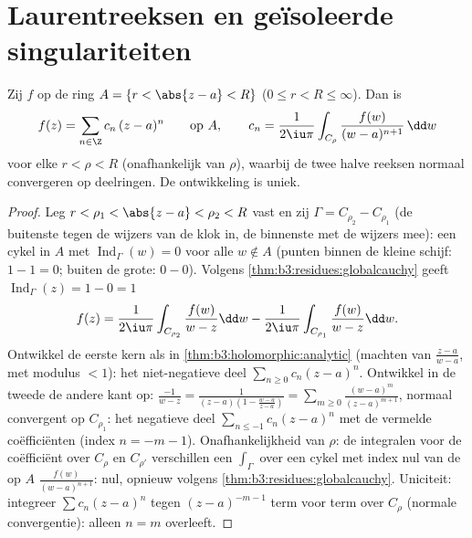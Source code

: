 \section{Laurentreeksen en geïsoleerde singulariteiten}

\begin{theorem}[Laurentontwikkeling]\label{thm:b3:residues:laurent}
Zij $f$  op de ring $A = \{r < \abs{z - a} < R\}$ ($0
\leq r < R \leq \infty$). Dan is
\[
f(z) = \sum_{n\in\Z}c_n\,(z - a)^n
\qquad\text{op } A,
\qquad
c_n = \frac1{2\iu\pi}\int_{C_\rho}\frac{f(w)}{(w -
a)^{n+1}}\,\dd w
\]
voor elke $r < \rho < R$ (onafhankelijk van $\rho$), waarbij de
twee halve reeksen normaal convergeren op  deelringen. De
ontwikkeling is uniek.
\end{theorem}

\begin{proof}
Leg $r < \rho_1 < \abs{z - a} < \rho_2 < R$ vast en zij $\Gamma =
C_{\rho_2} - C_{\rho_1}$ (de buitenste tegen de wijzers van de
klok in, de binnenste met de wijzers mee): een cykel in $A$ met
$\operatorname{Ind}_\Gamma(w) = 0$ voor alle $w \notin A$ (punten
binnen de kleine schijf: $1 - 1 = 0$; buiten de grote: $0 - 0$).
Volgens \cref{thm:b3:residues:globalcauchy} geeft
$\operatorname{Ind}_\Gamma(z) = 1 - 0 = 1$
\[
f(z) = \frac1{2\iu\pi}\int_{C_{\rho_2}}\frac{f(w)}{w - z}\dd
w - \frac1{2\iu\pi}\int_{C_{\rho_1}}\frac{f(w)}{w - z}\dd w .
\]
Ontwikkel de eerste kern als in
\cref{thm:b3:holomorphic:analytic} (machten van $\frac{z - a}{w -
a}$, met modulus $< 1$): het niet-negatieve deel
$\sum_{n\geq0}c_n(z-a)^n$. Ontwikkel in de tweede de andere kant
op: $\frac{-1}{w - z} = \frac1{(z-a)(1 - \frac{w - a}{z - a})} =
\sum_{m\geq0}\frac{(w-a)^m}{(z - a)^{m+1}}$, normaal convergent
op $C_{\rho_1}$: het negatieve deel $\sum_{n\leq-1}c_n(z-a)^n$
met de vermelde coëfficiënten (index $n = -m-1$). Onafhankelijkheid
van $\rho$: de integralen voor de coëfficiënt over $C_{\rho}$ en
$C_{\rho'}$ verschillen een $\int_\Gamma$ over een cykel met
index nul van de op $A$  $\frac{f(w)}{(w-a)^{n+1}}$:
nul, opnieuw volgens \cref{thm:b3:residues:globalcauchy}.
Uniciteit: integreer $\sum c_n(z-a)^n$ tegen $(z - a)^{-m-1}$
term voor term over $C_\rho$ (normale convergentie): alleen $n =
m$ overleeft.
\end{proof}

